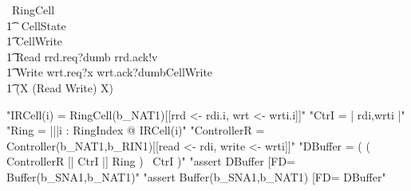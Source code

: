 \documentclass{article} %
\begin{document}
\begin{circus}
	\circprocess\ RingCell \circdef \circbegin \\
        \t1 \circstate\ CellState  \\
        \t1 CellWrite  \\
        \t1 Read \circdef rrd.req?dumb \then rrd.ack!v \then \Skip \\
        \t1 Write \circdef wrt.req?x \then wrt.ack?dumb\then \lschexpract CellWrite \rschexpract \\
        \t1 \circspot (\circmu X \circspot (Read \extchoice Write) \circseq X) \\
	\circend
\end{circus}
%
%
%

\begin{assert}
"IRCell(i) = RingCell(b_NAT1)[[rrd <- rdi.i, wrt <- wrti.i]]"
\also "CtrI = {| rdi,wrti |}"
\also "Ring = |||i : RingIndex @ IRCell(i)"
\also "ControllerR = Controller(b_NAT1,b_RIN1)[[read <- rdi, write <- wrti]]"
\also "DBuffer = ( ( ControllerR [| CtrI |] Ring ) \ CtrI )"
\also "assert DBuffer [FD= Buffer(b_SNA1,b_NAT1)"
\also "assert Buffer(b_SNA1,b_NAT1) [FD= DBuffer"
\end{assert}
\end{document}
